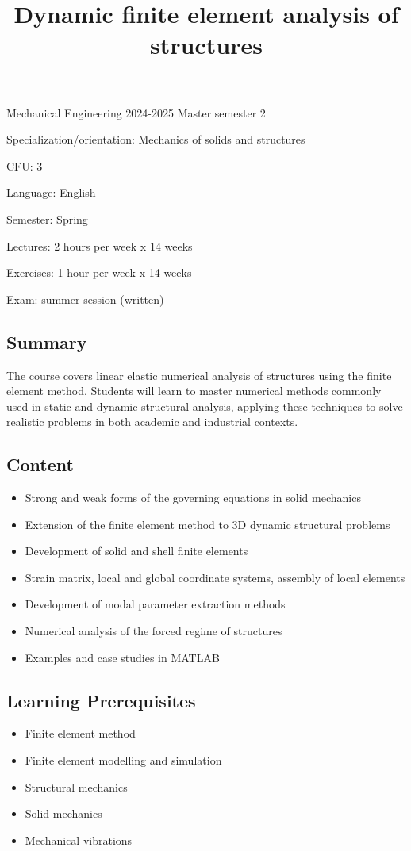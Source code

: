 \documentclass[11pt]{amsart}
\title{Dynamic finite element analysis of structures}
\begin{document}
\maketitle

\noindent Mechanical Engineering 2024-2025 Master semester 2

\noindent Specialization/orientation: Mechanics of solids and structures

\noindent CFU: 3

\noindent Language: English
 
\noindent Semester: Spring

\noindent Lectures: 2 hours per week x 14 weeks

\noindent Exercises: 1 hour per week x 14 weeks

\noindent Exam: summer session (written)

\subsection*{Summary}
The course covers linear elastic numerical analysis of structures using the finite element method. Students will learn to master numerical methods commonly used in static and dynamic structural analysis, applying these techniques to solve realistic problems in both academic and industrial contexts.

\subsection*{Content}
\begin{itemize}
\item Strong and weak forms of the governing equations in solid mechanics 
\item Extension of the finite element method to 3D dynamic structural problems
\item Development of solid and shell finite elements
\item  Strain matrix, local and global coordinate systems, assembly of local elements 
\item Development of modal parameter extraction methods
\item Numerical analysis of the forced regime of structures
\item Examples and case studies in MATLAB
\end{itemize}


\subsection*{Learning Prerequisites}
\begin{itemize}
\item Finite element method
\item Finite element modelling and simulation
\item Structural mechanics
\item Solid mechanics
\item Mechanical vibrations
\end{itemize}
\end{document}
